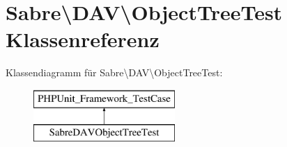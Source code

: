 \hypertarget{class_sabre_1_1_d_a_v_1_1_object_tree_test}{}\section{Sabre\textbackslash{}D\+AV\textbackslash{}Object\+Tree\+Test Klassenreferenz}
\label{class_sabre_1_1_d_a_v_1_1_object_tree_test}
Klassendiagramm für Sabre\textbackslash{}D\+AV\textbackslash{}Object\+Tree\+Test\+:\begin{figure}[H]
\begin{center}
\leavevmode
\includegraphics[height=2.000000cm]{class_sabre_1_1_d_a_v_1_1_object_tree_test}
\end{center}
\end{figure}
